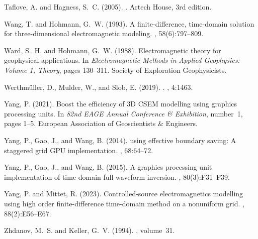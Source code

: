 \documentclass[a4paper,10pt]{article}
\begin{document}
\begin{thebibliography}{}
Taflove, A. and Hagness, S.~C. (2005).
.
\newblock Artech House, 3rd edition.

Wang, T. and Hohmann, G.~W. (1993).
\newblock A finite-difference, time-domain solution for three-dimensional
  electromagnetic modeling.
, 58(6):797--809.

Ward, S.~H. and Hohmann, G.~W. (1988).
\newblock Electromagnetic theory for geophysical applications.
\newblock In {\em {Electromagnetic Methods in Applied Geophysics: Volume 1,
  Theory}}, pages 130--311. Society of Exploration Geophysicists.

Werthmüller, D., Mulder, W., and Slob, E. (2019).
.
, 4:1463.

Yang, P. (2021).
\newblock Boost the efficiency of 3{D} {CSEM} modelling using graphics
  processing units.
\newblock In {\em 82nd EAGE Annual Conference \& Exhibition}, number~1, pages
  1--5. European Association of Geoscientists \& Engineers.

Yang, P., Gao, J., and Wang, B. (2014).
 using effective boundary saving: A staggered grid {GPU}
  implementation.
, 68:64--72.

Yang, P., Gao, J., and Wang, B. (2015).
\newblock A graphics processing unit implementation of time-domain
  full-waveform inversion.
, 80(3):F31--F39.

Yang, P. and Mittet, R. (2023).
\newblock Controlled-source electromagnetics modelling using high order
  finite-difference time-domain method on a nonuniform grid.
, 88(2):E56--E67.

Zhdanov, M.~S. and Keller, G.~V. (1994).
,
  volume~31.

\end{thebibliography}
\end{document}
